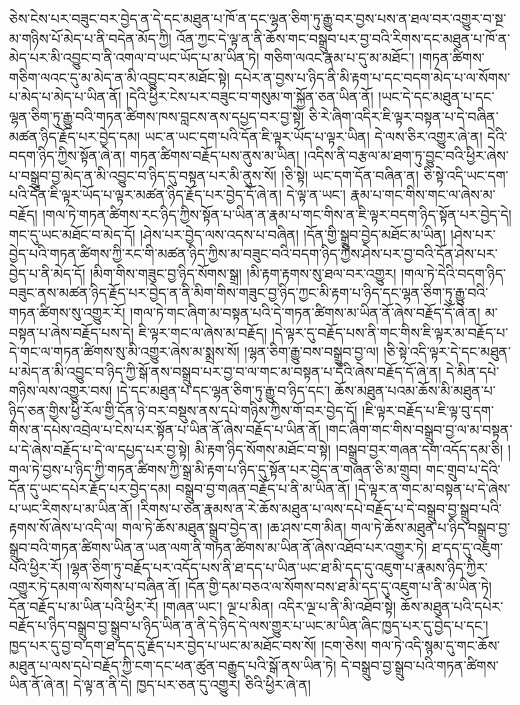 ཅེས་ངེས་པར་བཟུང་བར་བྱེད་ན་དེ་དང་མཐུན་པ་ཁོ་ན་དང་ལྷན་ཅིག་ཏུ་རྒྱུ་བར་བྱས་པས་ན་ཐལ་བར་འགྱུར་བ་སྔ་མ་གཉིས་པོ་མེད་པ་ནི་བདེན་མོད་ཀྱི། འོན་ཀྱང་དེ་ལྟ་ན་ནི་ཆོས་གང་བསྒྲུབ་པར་བྱ་བའི་རིགས་དང་མཐུན་པ་ཁོ་ན་མེད་པར་མི་འབྱུང་བ་ནི་འགལ་བ་ཡང་ཡོད་པ་མ་ཡིན་ཏེ། གཅིག་ལའང་རྣམ་པ་དུ་མ་མཐོང་། །གཏན་ཚིགས་གཅིག་ལའང་དུ་མ་མེད་ན་མི་འབྱུང་བར་མཐོང་སྟེ། དཔེར་ན་བྱས་པ་ཉིད་ནི་མི་རྟག་པ་དང་བདག་མེད་པ་ལ་སོགས་པ་མེད་པ་མེད་པ་ཡིན་ནོ། །དེའི་ཕྱིར་ངེས་པར་བཟུང་བ་གསུམ་ག་སྐྱོན་ཅན་ཡིན་ནོ། །ཡང་དེ་དང་མཐུན་པ་དང་ལྷན་ཅིག་ཏུ་རྒྱུ་བའི་གཏན་ཚིགས་ཁས་བླངས་ནས་དཔྱད་བར་བྱ་སྟེ། ཅི་རེ་ཞིག་འདིར་ཇི་ལྟར་བསྟན་པ་དེ་བཞིན་མཚན་ཉིད་རྗོད་པར་བྱེད་དམ། ཡང་ན་ཡང་དག་པའི་དོན་ཇི་ལྟར་ཡོད་པ་ལྟར་ཡིན། དེ་ལས་ཅིར་འགྱུར་ཞེ་ན། དེའི་བདག་ཉིད་ཀྱིས་སྟོན་ཞེ་ན། གཏན་ཚིགས་བརྗོད་པས་ནུས་མ་ཡིན། །འདིས་ནི་བརྩལ་མ་ཐག་ཏུ་བྱུང་བའི་ཕྱིར་ཞེས་པ་བསྒྲུབ་བྱ་མེད་ན་མི་འབྱུང་བ་ཉིད་དུ་བསྟན་པར་མི་ནུས་སོ། །ཅི་སྟེ། ཡང་དག་དོན་བཞིན་ན། ཅི་སྟེ་འདི་ཡང་དག་པའི་དོན་ཇི་ལྟར་ཡོད་པ་ལྟར་མཚན་ཉིད་རྗོད་པར་བྱེད་དོ་ཞེ་ན། དེ་ལྟ་ན་ཡང་། རྣམ་པ་གང་གིས་གང་ལ་ཞེས་མ་བརྗོད། །གལ་ཏེ་གཏན་ཚིགས་རང་ཉིད་ཀྱིས་སྟོན་པ་ཡིན་ན་རྣམ་པ་གང་གིས་ན་ཇི་ལྟར་བདག་ཉིད་སྟོན་པར་བྱེད་དེ། གང་དུ་ཡང་མཐོང་བ་མེད་དོ། །ཤེས་པར་བྱེད་ལས་འདས་པ་བཞིན། །དོན་གྱི་སྒྲུབ་བྱེད་མཐོང་མ་ཡིན། །ཤེས་པར་བྱེད་པའི་གཏན་ཚིགས་ཀྱི་རང་གི་མཚན་ཉིད་ཀྱིས་མ་བཟུང་བའི་བདག་ཉིད་ཀྱིས་ཤེས་པར་བྱ་བའི་དོན་ཤེས་པར་བྱེད་པ་ནི་མེད་དོ། །མིག་གིས་གཟུང་བྱ་ཉིད་སོགས་སྒྲ། །མི་རྟག་རྟགས་སུ་ཐལ་བར་འགྱུར། །གལ་ཏེ་དེའི་བདག་ཉིད་བཟུང་ནས་མཚན་ཉིད་རྗོད་པར་བྱེད་ན་ནི་མིག་གིས་གཟུང་བྱ་ཉིད་ཀྱང་མི་རྟག་པ་ཉིད་དང་ལྷན་ཅིག་ཏུ་རྒྱུ་བའི་གཏན་ཚིགས་སུ་འགྱུར་རོ། །གལ་ཏེ་གང་ཞིག་མ་བསྟན་པའི་དེ་གཏན་ཚིགས་མ་ཡིན་ནོ་ཞེས་བརྗོད་དོ་ཞེ་ན། མ་བསྟན་པ་ཞེས་བརྗོད་པས་དེ། ཇི་ལྟར་གང་ལ་ཞེས་མ་བརྗོད། །དེ་ལྟར་དུ་བརྗོད་པས་ནི་གང་གིས་ཇི་ལྟར་མ་བརྗོད་པ་དེ་གང་ལ་གཏན་ཚིགས་སུ་མི་འགྱུར་ཞེས་མ་སྨྲས་སོ། །ལྷན་ཅིག་རྒྱུ་བས་བསྒྲུབ་བྱ་ལ། །ཅི་སྟེ་འདི་ལྟར་དེ་དང་མཐུན་པ་མེད་ན་མི་འབྱུང་བ་ཉིད་ཀྱི་སྒོ་ནས་བསྒྲུབ་པར་བྱ་བ་ལ་གང་མ་བསྟན་པ་དེའི་ཞེས་བརྗོད་དོ་ཞེ་ན། དེ་མིན་དཔེ་གཉིས་ལས་འགྱུར་བས། །དེ་དང་མཐུན་པ་དང་ལྷན་ཅིག་ཏུ་རྒྱུ་བ་ཉིད་དང་། ཆོས་མཐུན་པའམ་ཆོས་མི་མཐུན་པ་ཉིད་ཅན་གྱིས་ཕྱི་རོལ་གྱི་དོན་ཉེ་བར་བསྡུས་ནས་དཔེ་གཉིས་ཀྱིས་གོ་བར་བྱེད་དོ། །ཇི་ལྟར་བརྗོད་པ་ཇི་ལྟ་བུ་དག་གིས་ན་དཔེས་འབྲེལ་པ་ངེས་པར་སྟོན་པ་ཡིན་ནོ་ཞེས་བརྗོད་པ་ཡིན་ནོ། །གང་ཞིག་གང་གིས་བསྒྲུབ་བྱ་ལ་མ་བསྟན་པ་དེ་ཞེས་བརྗོད་པ་དེ་ལ་དཔྱད་པར་བྱ་སྟེ། མི་རྟག་ཉིད་སོགས་མཐོང་བ་སྟེ། །བསྒྲུབ་བྱར་གཞན་དག་འདོད་དམ་ཅི། །གལ་ཏེ་བྱས་པ་ཉིད་ཀྱི་གཏན་ཚིགས་ཀྱི་སྒྲ་མི་རྟག་པ་ཉིད་དུ་སྟོན་པར་བྱེད་ན་གཞན་ཅི་མ་གྲུབ། གང་གྲུབ་པ་དེའི་དོན་དུ་ཡང་དཔེར་རྗོད་པར་བྱེད་དམ། བསྒྲུབ་བྱ་གཞན་བརྗོད་པ་ནི་མ་ཡིན་ནོ། །དེ་ལྟར་ན་གང་མ་བསྟན་པ་དེ་ཞེས་པ་ཡང་རིགས་པ་མ་ཡིན་ནོ། །རིགས་པ་ཅན་རྣམས་ན་རེ་ཆོས་མཐུན་པ་ལས་དཔེ་བརྗོད་པ་དེ་བསྒྲུབ་བྱ་སྒྲུབ་པའི་རྟགས་སོ་ཞེས་པ་འདི་ལ། གལ་ཏེ་ཆོས་མཐུན་སྒྲུབ་བྱེད་ན། །ཆ་ཤས་ངག་མིན། གལ་ཏེ་ཆོས་མཐུན་པ་ཉིད་བསྒྲུབ་བྱ་སྒྲུབ་བའི་གཏན་ཚིགས་ཡིན་ན་ཡན་ལག་ནི་གཏན་ཚིགས་མ་ཡིན་ནོ་ཞེས་འཐོབ་པར་འགྱུར་ཏེ། ཐ་དད་དུ་འཇུག་པའི་ཕྱིར་རོ། །ལྷན་ཅིག་ཏུ་བརྗོད་པར་འདོད་པས་ནི་ཐ་དད་པ་ཡིན་ཡང་ཐ་མི་དད་དུ་འཇུག་པ་རྣམས་ཉིད་ཀྱིར་འགྱུར་ཏེ་དམག་ལ་སོགས་པ་བཞིན་ནོ། །དོན་གྱི་དམ་བཅའ་ལ་སོགས་བས་ཐ་མི་དད་དུ་འཇུག་པ་ནི་མ་ཡིན་ཏེ། དོན་བརྗོད་པ་མ་ཡིན་པའི་ཕྱིར་རོ། །གཞན་ཡང་། ལྔ་པ་མིན། འདིར་ལྔ་པ་ནི་མི་འཐོབ་སྟེ། ཆོས་མཐུན་པའི་དཔེར་བརྗོད་པ་ཉིད་བསྒྲུབ་བྱ་སྒྲུབ་པ་ཉིད་ཡིན་ན་ནི་དེ་ཉིད་དེ་ལས་གྱུར་པ་ཡང་མ་ཡིན་ཞིང་ཁྱད་པར་དུ་བྱེད་པ་དང་། ཁྱད་པར་དུ་བྱ་བ་དག་ཐ་དད་དུ་རྗོད་པར་བྱེད་པ་ཡང་མ་མཐོང་བས་སོ། །ངག་ཅེས། གལ་ཏེ་འདི་སྙམ་དུ་གང་ཆོས་མཐུན་པ་ལས་དཔེ་བརྗོད་ཀྱི་ངག་དང་ཕན་ཚུན་བརྒྱུད་པའི་སྒོ་ནས་ཡིན་ཏེ། དེ་བསྒྲུབ་བྱ་སྒྲུབ་པའི་གཏན་ཚིགས་ཡིན་ནོ་ཞེ་ན། དེ་ལྟ་ན་ནི་དེ། ཁྱད་པར་ཅན་དུ་འགྱུར། ཅིའི་ཕྱིར་ཞེ་ན། 